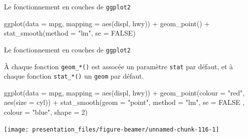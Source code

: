 \documentclass[12pt,handout,ignorenonframetext,]{beamer}
\newenvironment{Shaded}{}{}
\newcommand{\KeywordTok}[1]{\textcolor[rgb]{0.00,0.00,1.00}{#1}}
\newcommand{\DataTypeTok}[1]{#1}
\newcommand{\DecValTok}[1]{#1}
\newcommand{\StringTok}[1]{\textcolor[rgb]{0.00,0.50,0.50}{#1}}
\newcommand{\OtherTok}[1]{\textcolor[rgb]{1.00,0.25,0.00}{#1}}
\newcommand{\OperatorTok}[1]{#1}
\newcommand{\NormalTok}[1]{#1}
\renewenvironment{Shaded}{\begin{snugshade}}{\end{snugshade}}
\begin{document}
\begin{frame}[fragile]{\large Le fonctionnement en \og couches \fg{} de
\texttt{ggplot2}}
\begin{Shaded}
\begin{Highlighting}[]
\KeywordTok{ggplot}\NormalTok{(}\DataTypeTok{data =}\NormalTok{ mpg, }\DataTypeTok{mapping =} \KeywordTok{aes}\NormalTok{(displ, hwy)) }\OperatorTok{+}\StringTok{ }
\StringTok{  }\KeywordTok{geom_point}\NormalTok{() }\OperatorTok{+}\StringTok{ }\KeywordTok{stat_smooth}\NormalTok{(}\DataTypeTok{method =} \StringTok{"lm"}\NormalTok{, }\DataTypeTok{se =} \OtherTok{FALSE}\NormalTok{)}
\end{Highlighting}
\end{Shaded}

\end{frame}

\begin{frame}[fragile]{\large Le fonctionnement en \og couches \fg{} de
\texttt{ggplot2}}

À chaque fonction \texttt{geom\_*()} est assocée un paramètre
\texttt{stat} par défaut, et à chaque fonction \texttt{stat\_*()} un
\texttt{geom} par défaut.

\footnotesize \center

\begin{Shaded}
\begin{Highlighting}[]
\KeywordTok{ggplot}\NormalTok{(}\DataTypeTok{data =}\NormalTok{ mpg, }\DataTypeTok{mapping =} \KeywordTok{aes}\NormalTok{(displ, hwy)) }\OperatorTok{+}\StringTok{ }
\StringTok{  }\KeywordTok{geom_point}\NormalTok{(}\DataTypeTok{colour =} \StringTok{"red"}\NormalTok{, }\KeywordTok{aes}\NormalTok{(}\DataTypeTok{size =}\NormalTok{ cyl)) }\OperatorTok{+}\StringTok{ }
\StringTok{  }\KeywordTok{stat_smooth}\NormalTok{(}\DataTypeTok{geom =} \StringTok{"point"}\NormalTok{, }\DataTypeTok{method =} \StringTok{"lm"}\NormalTok{, }\DataTypeTok{se =} \OtherTok{FALSE}
\NormalTok{    , }\DataTypeTok{colour =} \StringTok{"blue"}\NormalTok{, }\DataTypeTok{shape =} \DecValTok{2}\NormalTok{)}
\end{Highlighting}
\end{Shaded}

\texttt{[image: presentation\_files/figure-beamer/unnamed-chunk-116-1]}

\end{frame}
\end{document}
